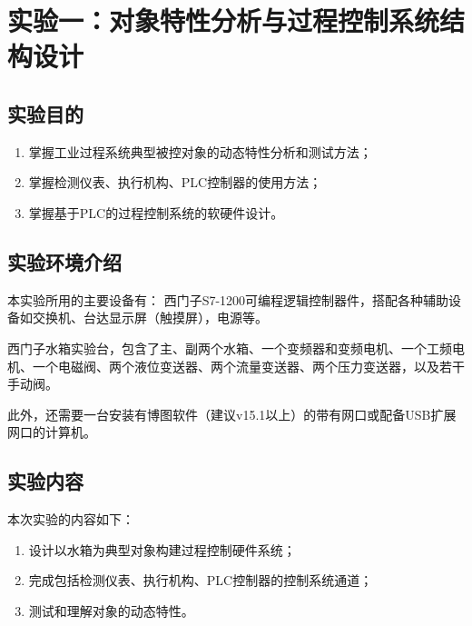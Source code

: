 \documentclass[UTF8]{article}
\begin{document}

\begin{titlepage}

\end{titlepage}

\tableofcontents
\cleardoublepage


%
\section{实验一：对象特性分析与过程控制系统结构设计}
\subsection{实验目的}
\begin{enumerate}
	\item 掌握工业过程系统典型被控对象的动态特性分析和测试方法；
	\item 掌握检测仪表、执行机构、PLC控制器的使用方法；
	\item 掌握基于PLC的过程控制系统的软硬件设计。
\end{enumerate}

\subsection{实验环境介绍}
本实验所用的主要设备有：
西门子S7-1200可编程逻辑控制器件，搭配各种辅助设备如交换机、台达显示屏（触摸屏），电源等。

西门子水箱实验台，包含了主、副两个水箱、一个变频器和变频电机、一个工频电机、一个电磁阀、两个液位变送器、两个流量变送器、两个压力变送器，以及若干手动阀。

此外，还需要一台安装有博图软件（建议v15.1以上）的带有网口或配备USB扩展网口的计算机。

\subsection{实验内容}
本次实验的内容如下：
\begin{enumerate}
	\item 设计以水箱为典型对象构建过程控制硬件系统；
	\item 完成包括检测仪表、执行机构、PLC控制器的控制系统通道；
	\item 测试和理解对象的动态特性。
\end{enumerate}
\end{document}
